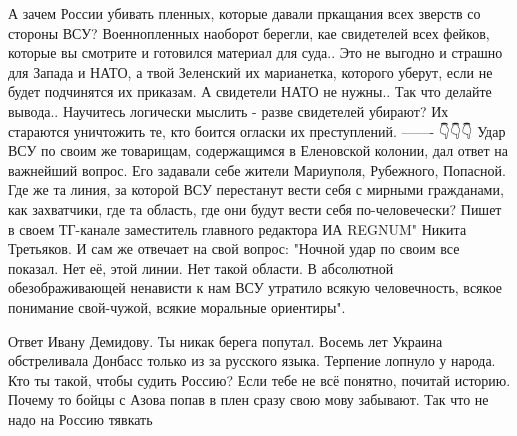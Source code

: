 А зачем России убивать пленных, которые давали пркащания всех зверств со стороны ВСУ?
Военнопленных наоборот берегли, кае свидетелей всех фейков, которые вы смотрите и готовился материал для суда..
Это не выгодно и страшно для Запада и НАТО, а твой Зеленский их марианетка, которого уберут, если не будет подчинятся их приказам.
А свидетели НАТО не нужны..
Так что делайте вывода..
Научитесь логически мыслить - разве свидетелей убирают?
Их стараются уничтожить те, кто боится огласки их преступлений.
-------
👇👇👇
Удар ВСУ по своим же товарищам, содержащимся в Еленовской колонии, дал ответ на важнейший вопрос. Его задавали себе жители Мариуполя, Рубежного, Попасной. Где же та линия, за которой ВСУ перестанут вести себя с мирными гражданами, как захватчики, где та область, где они будут вести себя по-человечески?
Пишет в своем ТГ-канале заместитель главного редактора ИА REGNUM" Никита Третьяков. И сам же отвечает на свой вопрос:
"Ночной удар по своим все показал. Нет её, этой линии. Нет такой области. В абсолютной обезображивающей ненависти к нам ВСУ утратило всякую человечность, всякое понимание свой-чужой, всякие моральные ориентиры".

Ответ Ивану Демидову. Ты никак берега попутал. Восемь лет Украина обстреливала
Донбасс только из за русского языка. Терпение лопнуло у народа. Кто ты такой,
чтобы судить Россию? Если тебе не всё понятно, почитай историю. Почему то бойцы
с Азова попав в плен сразу свою мову забывают. Так что не надо на Россию
тявкать

